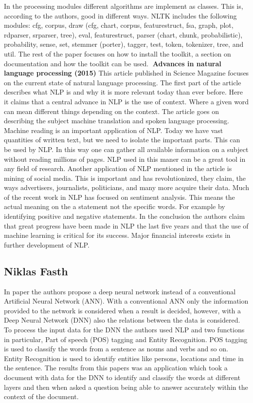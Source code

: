 In the processing modules different algorithms are implement as classes. This is, according to the authors, good in different ways. NLTK includes the following modules: cfg, corpus, draw (cfg, chart, corpus, featurestruct, fsa, graph, plot, rdparser, srparser, tree), eval, featurestruct, parser (chart, chunk, probabilistic), probability, sense, set, stemmer (porter), tagger, test, token, tokenizer, tree, and util. 
The rest of the paper focuses on how to install the toolkit, a section on documentation and how the toolkit can be used.
\textbf{Advances in natural language processing (2015)}
\newline
This article published in Science Magazine focuses on the current state of natural language processing. The first part of the article describes what NLP is and why it is more relevant today than ever before. Here it claims that a central advance in NLP is the use of context. Where a given word can mean different things depending on the context. The article goes on describing the subject machine translation and spoken language processing.
Machine reading is an important application of NLP. Today we have vast quantities of written text, but we need to isolate the important parts. This can be used by NLP.  In this way one can gather all available information on a subject without reading millions of pages. NLP used in this maner can be a great tool in any field of research. Another application of NLP mentioned in the article is mining of social media. This is important and has revolutionized, they claim, the ways advertisers, journalists, politicians, and many more acquire their data. 
Much of the recent work in NLP has focused on sentiment analysis. This means the actual meaning on the a statement not the specific words. For example by identifying positive and negative statements.
In the conclusion the authors claim that great progress have been made in NLP the last five years and that the use of machine learning is critical for its success. Major financial interests exists in further development of NLP.
\subsection{Niklas Fasth}
In paper \cite{ANN} the authors propose a deep neural network instead of a conventional Artificial Neural Network (ANN). With a conventional ANN only the information provided to the network is considered when a result is decided, however, with a Deep Neural Network (DNN) also the relations between the data is considered. To process the input data for the DNN the authors used NLP and two functions in particular, Part of speech (POS) tagging and Entity Recognition. POS tagging is used to classify the words from a sentence as nouns and verbs and so on. Entity Recognition is used to identify entities like persons, locations and time in the sentence.  The results from this papers was an application which took a document with data for the DNN to identify and classify the words at different layers and then when asked a question being able to answer accurately within the context of the document.

